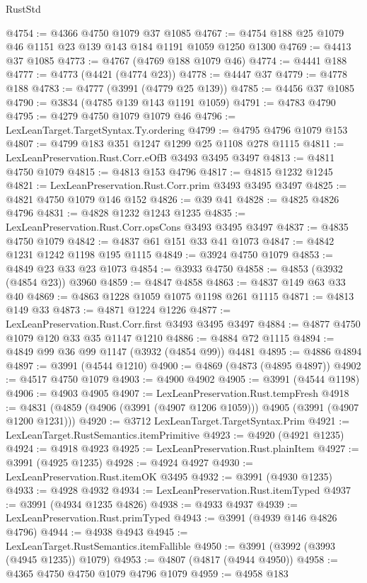 \begin{lexlean}{RustStd}
\begin{coremodule}
@4754 := @4366 @4750 @1079 @37 @1085
@4767 := @4754 @188 @25 @1079 @46 @1151 @23 @139 @143 @184 @1191 @1059 @1250 @1300
@4769 := @4413 @37 @1085
@4773 := @4767 (@4769 @188 @1079 @46)
@4774 := @4441 @188
@4777 := @4773 (@4421 (@4774 @23))
@4778 := @4447 @37
@4779 := @4778 @188
@4783 := @4777 (@3991 (@4779 @25 @139))
@4785 := @4456 @37 @1085
@4790 := @3834 (@4785 @139 @143 @1191 @1059)
@4791 := @4783 @4790
@4795 := @4279 @4750 @1079 @1079 @46
@4796 := LexLeanTarget.TargetSyntax.Ty.ordering
@4799 := @4795 @4796 @1079 @153
@4807 := @4799 @183 @351 @1247 @1299 @25 @1108 @278 @1115
@4811 := LexLeanPreservation.Rust.Corr.eOfB @3493 @3495 @3497
@4813 := @4811 @4750 @1079
@4815 := @4813 @153 @4796
@4817 := @4815 @1232 @1245
@4821 := LexLeanPreservation.Rust.Corr.prim @3493 @3495 @3497
@4825 := @4821 @4750 @1079 @146 @152
@4826 := @39 @41
@4828 := @4825 @4826 @4796
@4831 := @4828 @1232 @1243 @1235
@4835 := LexLeanPreservation.Rust.Corr.opsCons @3493 @3495 @3497
@4837 := @4835 @4750 @1079
@4842 := @4837 @61 @151 @33 @41 @1073
@4847 := @4842 @1231 @1242 @1198 @195 @1115
@4849 := @3924 @4750 @1079
@4853 := @4849 @23 @33 @23 @1073
@4854 := @3933 @4750
@4858 := @4853 (@3932 (@4854 @23)) @3960
@4859 := @4847 @4858
@4863 := @4837 @149 @63 @33 @40
@4869 := @4863 @1228 @1059 @1075 @1198 @261 @1115
@4871 := @4813 @149 @33
@4873 := @4871 @1224 @1226
@4877 := LexLeanPreservation.Rust.Corr.first @3493 @3495 @3497
@4884 := @4877 @4750 @1079 @120 @33 @35 @1147 @1210
@4886 := @4884 @72 @1115
@4894 := @4849 @99 @36 @99 @1147 (@3932 (@4854 @99)) @4481
@4895 := @4886 @4894
@4897 := @3991 (@4544 @1210)
@4900 := @4869 (@4873 (@4895 @4897))
@4902 := @4517 @4750 @1079
@4903 := @4900 @4902
@4905 := @3991 (@4544 @1198)
@4906 := @4903 @4905
@4907 := LexLeanPreservation.Rust.tempFresh
@4918 := @4831 (@4859 (@4906 (@3991 (@4907 @1206 @1059))) @4905 (@3991 (@4907 @1200 @1231)))
@4920 := @3712 LexLeanTarget.TargetSyntax.Prim
@4921 := LexLeanTarget.RustSemantics.itemPrimitive
@4923 := @4920 (@4921 @1235)
@4924 := @4918 @4923
@4925 := LexLeanPreservation.Rust.plainItem
@4927 := @3991 (@4925 @1235)
@4928 := @4924 @4927
@4930 := LexLeanPreservation.Rust.itemOK @3495
@4932 := @3991 (@4930 @1235)
@4933 := @4928 @4932
@4934 := LexLeanPreservation.Rust.itemTyped
@4937 := @3991 (@4934 @1235 @4826)
@4938 := @4933 @4937
@4939 := LexLeanPreservation.Rust.primTyped
@4943 := @3991 (@4939 @146 @4826 @4796)
@4944 := @4938 @4943
@4945 := LexLeanTarget.RustSemantics.itemFallible
@4950 := @3991 (@3992 (@3993 (@4945 @1235)) @1079)
@4953 := @4807 (@4817 (@4944 @4950))
@4958 := @4365 @4750 @4750 @1079 @4796 @1079
@4959 := @4958 @183

\end{coremodule}
\end{lexlean}
